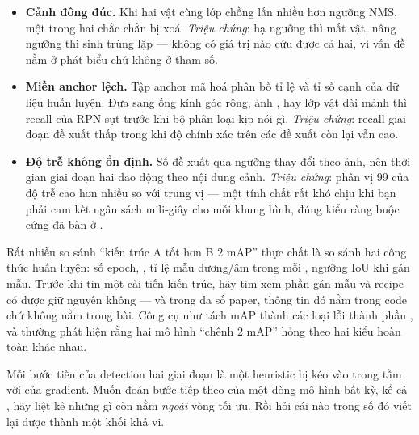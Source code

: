 \documentclass[../../../deep_learning.tex]{subfiles}
\begin{document}
\begin{itemize}
\item \textbf{Cảnh đông đúc.} Khi hai vật cùng lớp chồng lấn nhiều hơn ngưỡng NMS, một trong hai chắc chắn bị xoá. \emph{Triệu chứng}: hạ ngưỡng thì mất vật, nâng ngưỡng thì sinh trùng lặp --- không có giá trị nào cứu được cả hai, vì vấn đề nằm ở phát biểu chứ không ở tham số.
\item \textbf{Miền anchor lệch.} Tập anchor mã hoá phân bố tỉ lệ và tỉ số cạnh của dữ liệu huấn luyện. Đưa sang ống kính góc rộng, ảnh , hay lớp vật dài mảnh thì recall của RPN sụt trước khi bộ phân loại kịp nói gì. \emph{Triệu chứng}: recall giai đoạn đề xuất thấp trong khi độ chính xác trên các đề xuất còn lại vẫn cao.
\item \textbf{Độ trễ không ổn định.} Số đề xuất qua ngưỡng thay đổi theo ảnh, nên thời gian giai đoạn hai dao động theo nội dung cảnh. \emph{Triệu chứng}: phân vị 99 của độ trễ cao hơn nhiều so với trung vị --- một tính chất rất khó chịu khi bạn phải cam kết ngân sách mili-giây cho mỗi khung hình, đúng kiểu ràng buộc cứng đã bàn ở .
\end{itemize}

\begin{cambay}
Rất nhiều so sánh ``kiến trúc A tốt hơn B \(2\) mAP'' thực chất là so sánh hai công thức huấn luyện: số epoch, , tỉ lệ mẫu dương/âm trong mỗi , ngưỡng IoU khi gán mẫu. Trước khi tin một cải tiến kiến trúc, hãy tìm xem phần gán mẫu và recipe có được giữ nguyên không --- và trong đa số paper, thông tin đó nằm trong code chứ không nằm trong bài. 
Công cụ như  tách mAP thành các loại lỗi thành phần \cite{bolya2020tide, hoiem2012diagnosing}, và thường phát hiện rằng hai mô hình ``chênh 2 mAP'' hỏng theo hai kiểu hoàn toàn khác nhau.
\end{cambay}

\begin{cannho}
Mỗi bước tiến của detection hai giai đoạn là một heuristic bị kéo vào trong tầm với của gradient. Muốn đoán bước tiếp theo của một dòng mô hình bất kỳ, kể cả , hãy liệt kê những gì còn nằm \emph{ngoài} vòng tối ưu. Rồi hỏi cái nào trong số đó viết lại được thành một khối khả vi. 
\end{cannho}
\end{document}
